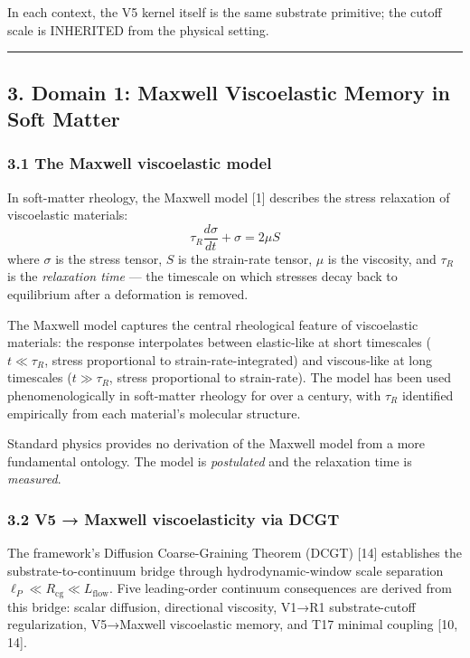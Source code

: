 \documentclass[
  11pt,
  a4paperpaper,
]{article}
\begin{document}
In each context, the V5 kernel itself is the same substrate primitive;
the cutoff scale is INHERITED from the physical setting.

\begin{center}\rule{0.5\linewidth}{0.5pt}\end{center}

\subsection{3. Domain 1: Maxwell Viscoelastic Memory in Soft
Matter}\label{domain-1-maxwell-viscoelastic-memory-in-soft-matter}

\subsubsection{3.1 The Maxwell viscoelastic
model}\label{the-maxwell-viscoelastic-model}

In soft-matter rheology, the Maxwell model {[}1{]} describes the stress
relaxation of viscoelastic materials:
\[\tau_R \frac{d\sigma}{dt} + \sigma = 2\mu S\] where \(\sigma\) is the
stress tensor, \(S\) is the strain-rate tensor, \(\mu\) is the
viscosity, and \(\tau_R\) is the \emph{relaxation time} --- the
timescale on which stresses decay back to equilibrium after a
deformation is removed.

The Maxwell model captures the central rheological feature of
viscoelastic materials: the response interpolates between elastic-like
at short timescales (\(t \ll \tau_R\), stress proportional to
strain-rate-integrated) and viscous-like at long timescales
(\(t \gg \tau_R\), stress proportional to strain-rate). The model has
been used phenomenologically in soft-matter rheology for over a century,
with \(\tau_R\) identified empirically from each material's molecular
structure.

Standard physics provides no derivation of the Maxwell model from a more
fundamental ontology. The model is \emph{postulated} and the relaxation
time is \emph{measured}.

\subsubsection{3.2 V5 → Maxwell viscoelasticity via
DCGT}\label{v5-maxwell-viscoelasticity-via-dcgt}

The framework's Diffusion Coarse-Graining Theorem (DCGT) {[}14{]}
establishes the substrate-to-continuum bridge through
hydrodynamic-window scale separation
\(\ell_P \ll R_{\mathrm{cg}} \ll L_{\mathrm{flow}}\). Five leading-order
continuum consequences are derived from this bridge: scalar diffusion,
directional viscosity, V1→R1 substrate-cutoff regularization, V5→Maxwell
viscoelastic memory, and T17 minimal coupling {[}10, 14{]}.
\end{document}
